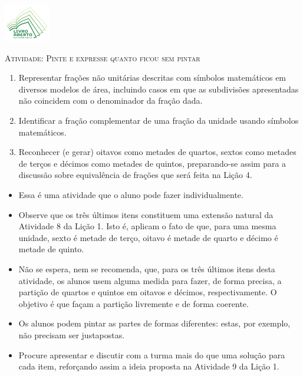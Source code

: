 \documentclass[10 pt,usenames,dvipsnames, oneside]{article}
\begin{document}
\begin{center}
  \begin{minipage}[l]{3cm}
\includegraphics[width=2cm]{../../../Figuras/logo}       
\end{minipage}\hfill
\begin{minipage}[r]{.8\textwidth}
 {\Large \scshape Atividade: Pinte e expresse quanto ficou sem pintar}  
\end{minipage}
\end{center}
\vspace{.2cm}

\ifdefined\prof
\begin{goals}
\begin{enumerate}

    \item       Representar frações não unitárias descritas com símbolos matemáticos em diversos modelos de área, incluindo casos em que as subdivisões apresentadas não coincidem com o denominador da fração dada.
    \item       Identificar a fração complementar de uma fração da unidade usando símbolos matemáticos.
    \item       Reconhecer (e gerar) oitavos como metades de quartos, sextos como metades de terços e décimos como metades de quintos, preparando-se assim para a discussão sobre equivalência de frações que será feita na Lição 4.

\end{enumerate}
\tcblower

\begin{itemize} %
    \item       Essa é uma atividade que o aluno pode fazer individualmente.
    \item       Observe que os três últimos itens constituem uma extensão natural da Atividade 8 da Lição 1. Isto é, aplicam o fato de que, para uma mesma unidade, sexto é metade de terço, oitavo é metade de quarto e décimo é metade de quinto.
    \item       Não se espera, nem se recomenda, que, para os três últimos itens desta atividade, os alunos usem alguma medida para fazer, de forma precisa, a partição de quartos e quintos em oitavos e décimos, respectivamente. O objetivo é que façam a partição livremente e de forma coerente.
    \item Os alunos podem pintar as partes de formas diferentes: estas, por exemplo, não precisam ser justapostas.
    \item Procure apresentar e discutir com a turma mais do que uma solução para cada item, reforçando assim a ideia proposta na Atividade 9 da Lição 1.
\end{itemize} %

\end{goals}
\end{document}
